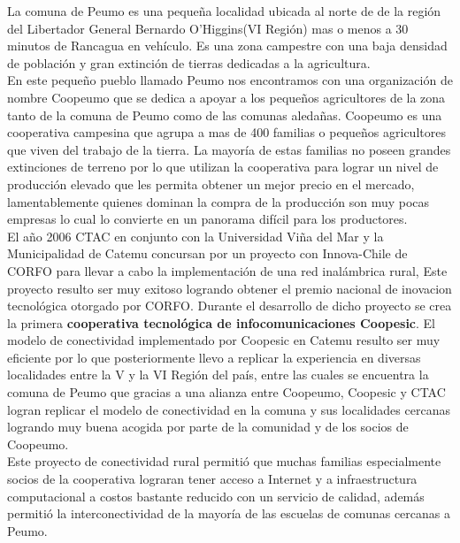 La comuna de Peumo es una pequeña localidad  ubicada al norte de de la región del Libertador General Bernardo O'Higgins(VI Región) mas o menos a 30 minutos de Rancagua en vehículo. Es una zona campestre con una baja densidad de población y gran extinción de tierras dedicadas a la agricultura.\\

En este pequeño pueblo llamado Peumo nos encontramos con una organización de nombre Coopeumo que se dedica a apoyar a los pequeños agricultores de la zona tanto de la comuna de Peumo como de las comunas aledañas. Coopeumo es una cooperativa campesina que agrupa a mas de 400\cite{Peumo:Online} familias o pequeños agricultores que viven del trabajo de la tierra. La mayoría de estas familias no poseen grandes extinciones de terreno por lo que utilizan la cooperativa para lograr un nivel de producción elevado que les permita obtener un mejor precio en el mercado, lamentablemente quienes dominan la compra de la producción son muy pocas empresas lo cual lo convierte en un panorama difícil para los productores.\\

El año 2006 CTAC en conjunto con la Universidad Viña del Mar y la Municipalidad de Catemu concursan por un proyecto con Innova-Chile de CORFO para llevar a cabo la implementación de una red inalámbrica rural, Este proyecto resulto ser muy exitoso logrando obtener el premio nacional de inovacion tecnológica otorgado por CORFO. Durante el desarrollo de dicho proyecto se crea la primera \textbf{cooperativa tecnológica de infocomunicaciones Coopesic}\cite{Coopesic:Online}. El modelo de conectividad implementado por Coopesic en Catemu resulto ser muy eficiente por lo que posteriormente llevo a replicar la experiencia en diversas localidades entre la V y la VI Región del país, entre las cuales se encuentra la comuna de Peumo que gracias a una alianza entre Coopeumo, Coopesic y CTAC logran replicar el modelo de conectividad en la comuna y sus localidades cercanas logrando muy buena acogida por parte de la comunidad y de los socios de Coopeumo.\\

Este proyecto de conectividad rural permitió que muchas familias especialmente socios de la cooperativa lograran tener acceso a Internet y a infraestructura computacional a costos bastante reducido con un servicio de calidad, además permitió la interconectividad de la mayoría de las escuelas de comunas cercanas a Peumo.\\

